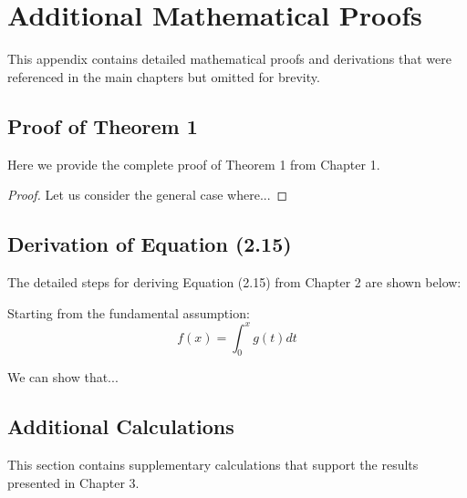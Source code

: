 \chapter{Additional Mathematical Proofs}

This appendix contains detailed mathematical proofs and derivations that were referenced in the main chapters but omitted for brevity.

\section{Proof of Theorem 1}

Here we provide the complete proof of Theorem 1 from Chapter 1.

\begin{proof}
Let us consider the general case where... \lipsum[1]
\end{proof}

\section{Derivation of Equation (2.15)}

The detailed steps for deriving Equation (2.15) from Chapter 2 are shown below:

Starting from the fundamental assumption:
\begin{equation}
f(x) = \int_0^x g(t) dt
\end{equation}

We can show that... \lipsum[2]

\section{Additional Calculations}

This section contains supplementary calculations that support the results presented in Chapter 3.

\lipsum[3-4]
